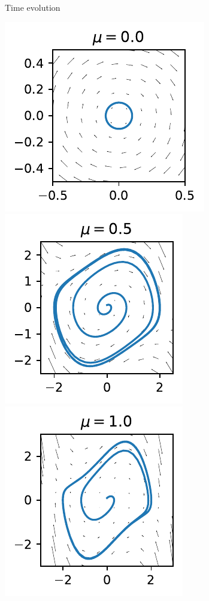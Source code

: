 \begin{figure}[h]
\begin{subfigure}[b]{\textwidth}
	\caption{Time evolution}\label{fig:vdp_timeplots}
    \end{subfigure}
    \begin{subfigure}[b]{\textwidth}
        \centering
	\includegraphics{images/vdp_statespace_mu_00.pdf}
	\includegraphics{images/vdp_statespace_mu_05.pdf}
	\includegraphics{images/vdp_statespace_mu_10.pdf}

\end{subfigure}
\end{figure}
